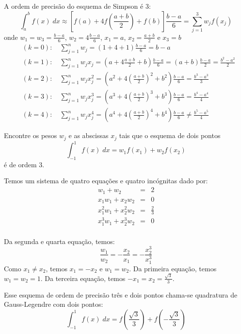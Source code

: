 \begin{ex}
A ordem de precisão do esquema de Simpson é 3:
$$\int_a^b f(x)\;dx \approx \left[f(a)+4f\left(\frac{a+b}{2}\right)+f(b)\right]\frac{b-a}{6}=\sum_{j=1}^3w_jf(x_j)$$
onde $w_1=w_3=\frac{b-a}{6}$, $w_2=4\frac{b-a}{6}$, $x_1=a$, $x_2=\frac{a+b}{2}$ e $x_3=b$
\begin{eqnarray*}
  &(k=0):\quad\sum_{j=1}^n w_j = (1+4+1)\frac{b-a}{6}=b-a\\
  &(k=1):\quad\sum_{j=1}^n w_jx_j = (a+4\frac{a+b}{2}+b)\frac{b-a}{6} = (a+b)\frac{b-a}{2} = \frac{b^2-a^2}{2}\\
  &(k=2):\quad\sum_{j=1}^n w_jx_j^2 = (a^2+4\left(\frac{a+b}{2}\right)^2+b^2)\frac{b-a}{6} = \frac{b^3-a^3}{3}\\
  &(k=3):\quad\sum_{j=1}^n w_jx_j^3 = (a^3+4\left(\frac{a+b}{2}\right)^3+b^3)\frac{b-a}{6}= \frac{b^4-a^4}{4}\\
  &(k=4):\quad\sum_{j=1}^n w_jx_j^4 = (a^4+4\left(\frac{a+b}{2}\right)^4+b^4)\frac{b-a}{6}\neq \frac{b^5-a^5}{4}
\end{eqnarray*}
\end{ex}

\begin{ex}
Encontre os pesos $w_j$ e as abscissas $x_j$ tais que o esquema de dois pontos
$$\int_{-1}^1 f(x)\;dx = w_1f(x_1)+w_2f(x_2)$$
é de ordem 3.
\end{ex}
\begin{sol}
  Temos um sistema de quatro equações e quatro incógnitas dado por:
\begin{eqnarray*}
w_1+w_2&=&2\\
x_1w_1+x_2w_2&=&0\\
x_1^2w_1+x_2^2w_2&=&\frac{2}{3}\\
x_1^3w_1+x_2^3w_2&=&0\\
\end{eqnarray*}

Da segunda e quarta equação, temos:
$$\frac{w_1}{w_2}=-\frac{x_2}{x_1}=-\frac{x_2^3}{x_1^3}$$
Como $x_1\neq x_2$, temos $x_1=-x_2$ e $w_1=w_2$. Da primeira equação, temos $w_1=w_2=1$. Da terceira equação, temos $-x_1=x_2=\frac{\sqrt{3}}{3}$.

Esse esquema de ordem de precisão três e dois pontos chama-se quadratura de Gauss-Legendre com dois pontos:
$$\int_{-1}^1 f(x)\;dx = f\left(\frac{\sqrt{3}}{3}\right)+f\left(-\frac{\sqrt{3}}{3}\right)$$
\end{sol}


